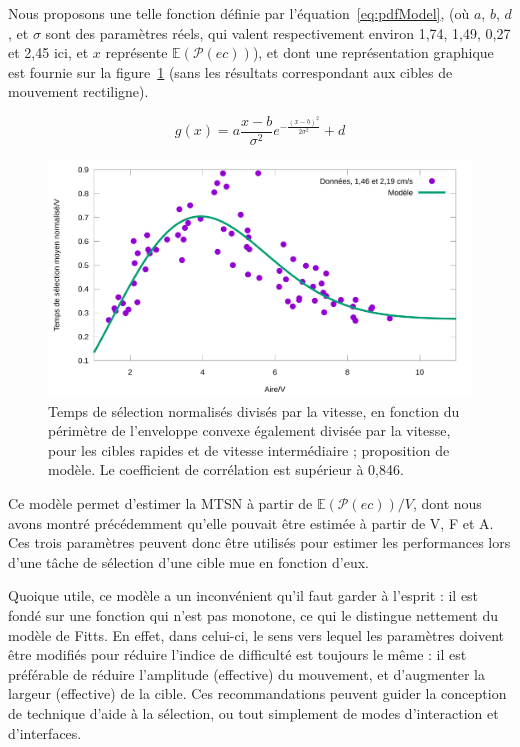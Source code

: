 	Nous proposons une telle fonction définie par l'équation~\ref{eq:pdfModel}, (où $a$, $b$, $d$, et $\sigma$ sont des paramètres réels, qui valent respectivement environ 1,74, 1,49, 0,27 et 2,45 ici, et $x$ représente $\mathbb{E}(\mathcal{P}(ec))$), et dont une représentation graphique est fournie sur la figure~\ref{fig:timeVareaFit} (sans les résultats correspondant aux cibles de mouvement rectiligne).
	
	\begin{equation}
		g(x) = a\frac{x-b}{\sigma^{2}}e^{-\frac{(x-b)^{2}}{2\sigma^{2}} } + d
		\label{eq:pdfModel}
	\end{equation}
	
	\begin{figure}[!htbp]
		\centering
		\includegraphics[width=\textwidth]{figures/ch4/timeVareaFit}
		\caption[Temps de sélection/V en fonction de $\mathbb{E}(\mathcal{P}(ec))/V$ et modèle]{Temps de sélection normalisés divisés par la vitesse, en fonction du périmètre de l'enveloppe convexe également divisée par la vitesse, pour les cibles rapides et de vitesse intermédiaire ; proposition de modèle. Le coefficient de corrélation est supérieur à 0,846.}
		\label{fig:timeVareaFit}
	\end{figure}
	
	Ce modèle permet d'estimer la MTSN à partir de $\mathbb{E}(\mathcal{P}(ec))/V$, dont nous avons montré précédemment qu'elle pouvait être estimée à partir de V, F et A. Ces trois paramètres peuvent donc être utilisés pour estimer les performances lors d'une tâche de sélection d'une cible mue en fonction d'eux.
	
	Quoique utile, ce modèle a un inconvénient qu'il faut garder à l'esprit : il est fondé sur une fonction qui n'est pas monotone, ce qui le distingue nettement du modèle de Fitts. En effet, dans celui-ci, le sens vers lequel les paramètres doivent être modifiés pour réduire l'indice de difficulté est toujours le même : il est préférable de réduire l'amplitude (effective) du mouvement, et d'augmenter la largeur (effective) de la cible. Ces recommandations peuvent guider la conception de technique d'aide à la sélection, ou tout simplement de modes d'interaction et d'interfaces.
	
